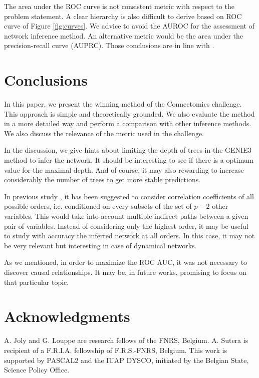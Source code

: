 \documentclass[wcp]{jmlr}
\begin{document}
The area under the ROC curve is not consistent metric
with respect to the problem statement. A clear hierarchy is also difficult to
derive based on ROC curve of Figure \ref{fig:curves}. We advice to avoid the AUROC
for the assessment of network inference method. An alternative metric would
be the area under the precision-recall curve (AUPRC). Those
conclusions are in line with \cite{schrynemackers2013protocols}.


\section{Conclusions} \label{sec:conclusion}





In this paper, we present the winning method of the Connectomics challenge.
This approach is simple and theoretically grounded. We also evaluate the method
in a more detailed way and perform a comparison with other inference methods.
We also discuss the relevance of the metric used in the challenge.

In the discussion, we give hints about limiting the depth of trees in the GENIE3
method to infer the network. It should be interesting to see if there is a
optimum value for the maximal depth. And of course, it may also rewarding to increase considerably the number of trees to get more stable predictions.

In previous study \citep{shipley2002cause}, it has been suggested to
consider correlation coefficients of all possible orders,
i.e. conditioned on every subsets of the set of $p-2$ other variables. This
would take into account multiple indirect paths between a given pair of
variables. Instead of considering only the highest order, it may be useful to
study with accuracy the inferred network at all orders. In this case, it may not
be very relevant but interesting in case of dynamical networks.

As we mentioned, in order to maximize the ROC AUC, it was not necessary to
discover causal relationships. It may be, in future works, promising to focus
on that particular topic.


\section*{Acknowledgments}
A. Joly and G. Louppe are research fellows of
the FNRS, Belgium.  A. Sutera is recipient of
a F.R.I.A. fellowship of F.R.S.-FNRS, Belgium.
This work is supported by PASCAL2 and the IUAP DYSCO, initiated by the
Belgian State, Science Policy Office.
\end{document}
